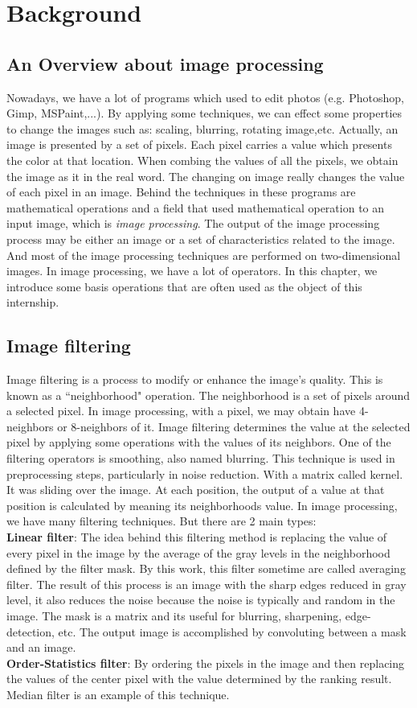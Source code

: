 \chapter{Background}\section{An Overview about image processing}
Nowadays, we have a lot of programs which used to edit photos (e.g. Photoshop, Gimp, MSPaint,...). By applying some techniques, we can effect some properties to change the images such as: scaling, blurring, rotating image,etc. Actually, an image is presented by a set of pixels. Each pixel carries a value which presents the color at that location. When combing the values of all the pixels, we obtain the image as it in the real word. The changing on image really changes the value of each pixel in an image. Behind the techniques in these programs are mathematical operations and a field that used mathematical operation to an input image,  which is \textit{image processing}. The output of the image processing process may be either an image or a set of characteristics related to the image. And most of the image processing techniques are performed on two-dimensional images. In image processing, we have a lot of operators. In this chapter, we introduce some basis operations that are often used as the object of this internship.
\section{Image filtering}
Image filtering is a process to modify or enhance the image's quality. This is known as a ``neighborhood" operation. The neighborhood is a set of pixels around a selected pixel. In image processing, with a pixel, we may obtain have 4-neighbors or 8-neighbors of it. Image filtering determines the value at the selected pixel by applying some operations with the values of its neighbors. One of the filtering operators is smoothing, also named blurring. This technique is used in preprocessing steps, particularly in noise reduction. With a matrix called kernel. It was sliding over the image. At each position, the output of a value at that position is calculated by meaning its neighborhoods value.
In image processing, we have many filtering techniques. But there are 2 main types:\\[0.2cm]
\textbf{Linear filter}: The idea behind this filtering method is replacing the value of every pixel in the image by the average of the gray levels in the neighborhood defined by the filter mask. By this work, this filter sometime are called averaging filter. The result of this process is an image with the sharp edges reduced in gray level, it also reduces the noise because the noise is typically and random in the image. The mask is a matrix and its useful for blurring, sharpening, edge-detection, etc. The output image is accomplished by convoluting between a mask and an image.\\[0.2cm]
\textbf{Order-Statistics filter}: By ordering the pixels in the image and then replacing the values of the center pixel with the value determined by the ranking result. Median filter is an example of this technique.
